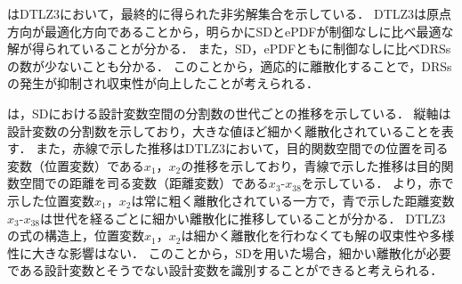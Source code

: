 \documentclass[../main/main]{subfiles}
\begin{document}
はDTLZ3において，最終的に得られた非劣解集合を示している．
DTLZ3は原点方向が最適化方向であることから，明らかにSDとePDFが制御なしに比べ最適な解が得られていることが分かる．
また，SD，ePDFともに制御なしに比べDRSsの数が少ないことも分かる．
このことから，適応的に離散化することで，DRSsの発生が抑制され収束性が向上したことが考えられる．

は，SDにおける設計変数空間の分割数の世代ごとの推移を示している．
縦軸は設計変数の分割数を示しており，大きな値ほど細かく離散化されていることを表す．
また，赤線で示した推移はDTLZ3において，目的関数空間での位置を司る変数（位置変数）である$x_1$，$x_2$の推移を示しており，青線で示した推移は目的関数空間での距離を司る変数（距離変数）である$x_3$-$x_{38}$を示している．
より，赤で示した位置変数$x_1$，$x_2$は常に粗く離散化されている一方で，青で示した距離変数$x_3$-$x_{38}$は世代を経るごとに細かい離散化に推移していることが分かる．
DTLZ3の式の構造上，位置変数$x_1$，$x_2$は細かく離散化を行わなくても解の収束性や多様性に大きな影響はない．
このことから，SDを用いた場合，細かい離散化が必要である設計変数とそうでない設計変数を識別することができると考えられる．

\clearpage
\end{document}
